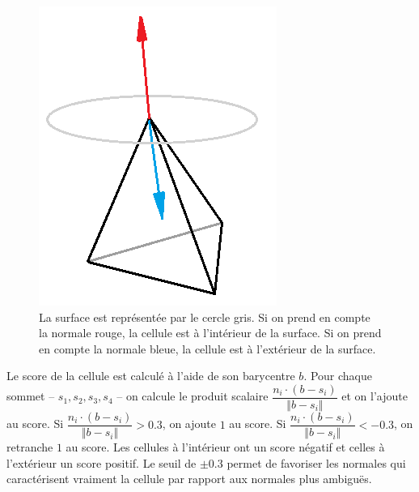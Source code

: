 ﻿\documentclass[12pt, twoside]{article}
\begin{document}
\begin{figure}[h]
\centering
\includegraphics[scale=0.4]{InOut.png}
\caption{\label{fig:inout} La surface est représentée par le cercle gris. Si on prend en compte la normale rouge, la cellule est à l'intérieur de la surface. Si on prend en compte la normale bleue, la cellule est à l'extérieur de la surface.}
\end{figure}

Le score de la cellule est calculé à l'aide de son barycentre $b$. Pour chaque sommet -- $s_1, s_2, s_3, s_4$ -- on calcule le produit scalaire $\dfrac{n_i\cdot(b-s_i)}{\Vert b-s_i\Vert}$ et on l'ajoute au score. Si $\dfrac{n_i\cdot(b-s_i)}{\Vert b-s_i\Vert} > 0.3$, on ajoute $1$ au score. Si $\dfrac{n_i\cdot(b-s_i)}{\Vert b-s_i\Vert} < -0.3$, on retranche $1$ au score. Les cellules à l'intérieur ont un score négatif et celles à l'extérieur un score positif. Le seuil de $\pm 0.3$ permet de favoriser les normales qui caractérisent vraiment la cellule par rapport aux normales plus ambiguës.
\end{document}
